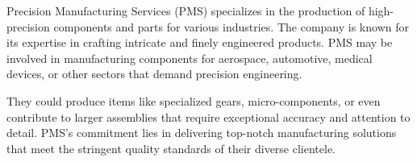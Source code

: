 Precision Manufacturing Services (PMS) specializes in the production of high-precision components 
and parts for various industries. 
The company is known for its expertise in crafting intricate and finely engineered products. 
PMS may be involved in manufacturing components for aerospace, automotive, medical devices, or 
other sectors that demand precision engineering.

They could produce items like specialized gears, micro-components, or even contribute to larger 
assemblies that require exceptional accuracy and attention to detail. PMS's commitment lies in 
delivering top-notch manufacturing solutions that meet the stringent quality standards of their 
diverse clientele.


